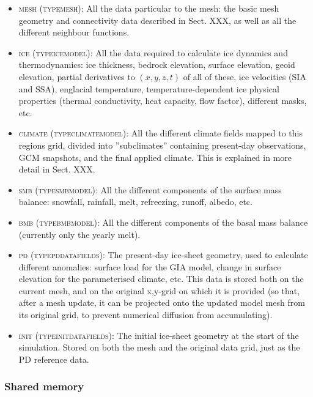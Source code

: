 \documentclass{article}
\begin{document}
\begin{itemize}
\item \textsc{mesh (type\textunderscore mesh)}: All the data particular to the mesh: the basic mesh geometry and connectivity data described in Sect. XXX, as well as all the different neighbour functions.
\item \textsc{ice (type\textunderscore ice\textunderscore model)}: All the data required to calculate ice dynamics and thermodynamics: ice thickness, bedrock elevation, surface elevation, geoid elevation, partial derivatives to $(x,y,z,t)$ of all of these, ice velocities (SIA and SSA), englacial temperature, temperature-dependent ice physical properties (thermal conductivity, heat capacity, flow factor), different masks, etc.
\item \textsc{climate (type\textunderscore climate\textunderscore model)}: All the different climate fields mapped to this regions grid, divided into ''subclimates'' containing present-day observations, GCM snapshots, and the final applied climate. This is explained in more detail in Sect. XXX.
\item \textsc{smb (type\textunderscore smb\textunderscore model)}: All the different components of the surface mass balance: snowfall, rainfall, melt, refreezing, runoff, albedo, etc.
\item \textsc{bmb (type\textunderscore bmb\textunderscore model)}: All the different components of the basal mass balance (currently only the yearly melt).
\item \textsc{pd (type\textunderscore pd\textunderscore data\textunderscore fields)}: The present-day ice-sheet geometry, used to calculate different anomalies: surface load for the GIA model, change in surface elevation for the parameterised climate, etc. This data is stored both on the current mesh, and on the original x,y-grid on which it is provided (so that, after a mesh update, it can be projected onto the updated model mesh from its original grid, to prevent numerical diffusion from accumulating).
\item \textsc{init (type\textunderscore init\textunderscore data\textunderscore fields)}: The initial ice-sheet geometry at the start of the simulation. Stored on both the mesh and the original data grid, just as the PD reference data.
\end{itemize}

\subsubsection{Shared memory}
\end{document}
